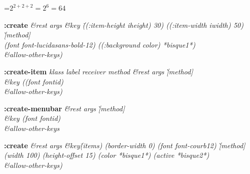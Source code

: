 {\newpage
\clearpage
\samepage 
\setbox\sizebox=\hbox{$2^{2+2+2}=2^6=64$}\box\sizebox
}

{\newpage
\clearpage
\samepage 
}

{\newpage
\clearpage
\samepage 
\begin{emtabbing}{\bf :create} 
\it \&rest args \= \&key \= ((:item-height iheight) 30)
((:item-width iwidth) 50)
\` [method]\\  
\>\> (font font-lucidasans-bold-12)  ((:background color) *bisque1*) \\  
\> \&allow-other-keys)
\rm
\end{emtabbing}
}

{\newpage
\clearpage
\samepage 
\begin{figure}\begin{center}
\end{center}

\end{figure}
}

{\newpage
\clearpage
\samepage 
\begin{emtabbing}{\bf :create-item} 
\it klass label receiver method \= \&rest args
\` [method]\\  
\> \&key ((font fontid)\\  
\> \&allow-other-keys)
\rm
\end{emtabbing}
}

{\newpage
\clearpage
\samepage 
\begin{emtabbing}{\bf :create-menubar} 
\it  \= \&rest args \`[method]\\  
\> \&key (font fontid)\\  
\> \&allow-other-keys
\rm
\end{emtabbing}
}

{\newpage
\clearpage
\samepage 
\begin{emtabbing}{\bf :create} 
\it \&rest args \= \&key\= (items) (border-width 0)
   (font font-courb12)
\` [method]\\  
\>\> (width 100) (height-offset 15) (color *bisque1*)
                      (active *bisque2*) \\  
           \>\&allow-other-keys) 
  
\rm
\end{emtabbing}
}

